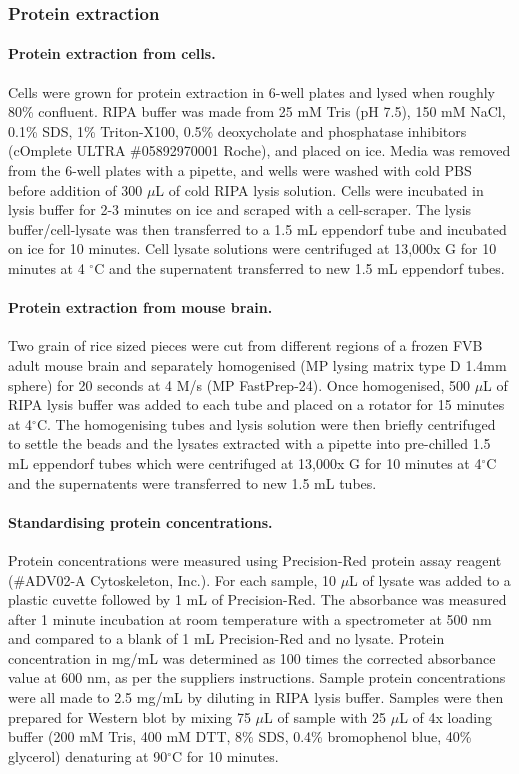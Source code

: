 \documentclass[a4paper,11pt,twoside,openright]{scrbook}
\begin{document}
\subsubsection{Protein extraction}

\paragraph{Protein extraction from cells.}
Cells were grown for protein extraction in 6-well plates and lysed when roughly 80\% confluent.
RIPA buffer was made from 25 mM Tris (pH 7.5), 150 mM NaCl, 0.1\% SDS, 1\% Triton-X100, 0.5\% deoxycholate and phosphatase inhibitors (cOmplete ULTRA \#05892970001 Roche), and placed on ice.
Media was removed from the 6-well plates with a pipette, and wells were washed with cold PBS before addition of 300 $\mu$L of cold RIPA lysis solution.
Cells were incubated in lysis buffer for 2-3 minutes on ice and scraped with a cell-scraper. The lysis buffer/cell-lysate was then transferred to a 1.5 mL eppendorf tube and incubated on ice for 10 minutes.
Cell lysate solutions were centrifuged at 13,000x G for 10 minutes at 4 $^\circ$C and the supernatent transferred to new 1.5 mL eppendorf tubes.


\paragraph{Protein extraction from mouse brain.}
Two grain of rice sized pieces were cut from different regions of a frozen FVB adult mouse brain and separately homogenised (MP lysing matrix type D 1.4mm sphere) for 20 seconds at 4 M/s (MP FastPrep-24).
Once homogenised, 500 $\mu$L of RIPA lysis buffer was added to each tube and placed on a rotator for 15 minutes at 4$^\circ$C.
The homogenising tubes and lysis solution were then briefly centrifuged to settle the beads and the lysates extracted with a pipette into pre-chilled 1.5 mL eppendorf tubes which were centrifuged at 13,000x G for 10 minutes at 4$^\circ$C and the supernatents were transferred to new 1.5 mL tubes.


\paragraph{Standardising protein concentrations.}
Protein concentrations were measured using Precision-Red protein assay reagent (\#ADV02-A Cytoskeleton, Inc.).
For each sample, 10 $\mu$L of lysate was added to a plastic cuvette followed by 1 mL of Precision-Red.
The absorbance was measured after 1 minute incubation at room temperature with a spectrometer at 500 nm and compared to a blank of 1 mL Precision-Red and no lysate.
Protein concentration in mg/mL was determined as 100 times the corrected absorbance value at 600 nm, as per the suppliers instructions.
Sample protein concentrations were all made to 2.5 mg/mL by diluting in RIPA lysis buffer.
Samples were then prepared for Western blot by mixing 75 $\mu$L of sample with 25 $\mu$L of 4x loading buffer (200 mM Tris, 400 mM DTT, 8\% SDS, 0.4\% bromophenol blue, 40\% glycerol) denaturing at 90$^\circ$C for 10 minutes.
\end{document}
